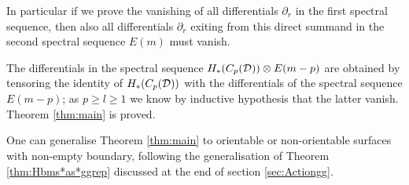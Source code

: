 In particular if we prove the vanishing of all differentials $\partial_r$
in the first spectral sequence, then also all differentials
$\partial_r$ exiting from this direct summand in the
second spectral sequence $E(m)$ must vanish.

The differentials in the spectral sequence $H_*(C_p(\mathcal{D}))\otimes E(m-p)$
are obtained by tensoring the identity of $H_*(C_p(\mathcal{D}))$ with the differentials
of the spectral sequence $E(m-p)$; as $p\geq l\geq 1$ we know by inductive hypothesis
that the latter vanish. Theorem \ref{thm:main} is proved.

One can generalise Theorem \ref{thm:main} to orientable or non-orientable
surfaces with non-empty boundary, following the generalisation
of Theorem \ref{thm:Hbms*as*ggrep} discussed at the end of section \ref{sec:Actiongg}.